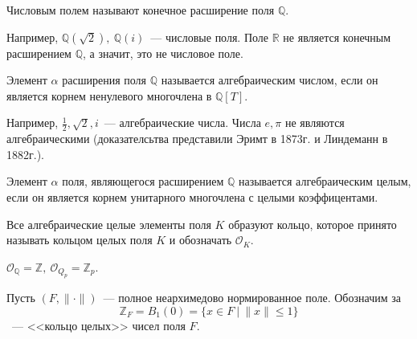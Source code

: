 \documentclass[11pt]{article}
\begin{document}
    \begin{definition}
        Числовым полем называют конечное расширение поля $\mathbb{Q}$.
    \end{definition}
    \begin{example}
        Например,  $\mathbb{Q}(\sqrt{2}), \ \mathbb{Q}(i)$~--- числовые поля. Поле $\mathbb{R}$ не является конечным расширением
        $\mathbb{Q}$, а значит, это не числовое поле.
    \end{example}
    \begin{definition}
        Элемент $\alpha$ расширения поля $\mathbb{Q}$ называется алгебраическим числом, если он является корнем ненулевого многочлена
        в $\mathbb{Q}[T]$.
    \end{definition}
    \begin{example}
        Например, $\frac{1}{2}, \sqrt{2}, i$~--- алгебраические числа. Числа $e, \pi$ не являются алгебраическими (доказателсьтва представили
        Эримт в 1873г. и Линдеманн в 1882г.).
    \end{example}
    \begin{definition}
        Элемент $\alpha$ поля, являющегося расширением $\mathbb{Q}$ называется алгебраическим целым, если он является корнем унитарного многочлена
        с целыми коэффицентами.
    \end{definition}
    \begin{definition}
        Все алгебраические целые элементы поля $K$ образуют кольцо, которое принято называть кольцом целых поля $K$ и обозначать $\mathcal{O}_{K}$.
    \end{definition}
    \begin{example}
        $\mathcal{O}_{\mathbb{Q}} = \mathbb{Z}, \ \mathcal{O}_{Q_{p}} = \mathbb{Z}_p$.
    \end{example}
    \begin{definition}
        Пусть $(F, \| \cdot \|)$~--- полное неархимедово нормированное поле. Обозначим за
        \[ \mathbb{Z}_{F} = B_1(0) = \{ x \in F \ | \ \| x \| \le 1 \} \]
        ~--- <<кольцо целых>> чисел поля $F$.
    \end{definition}
\end{document}
